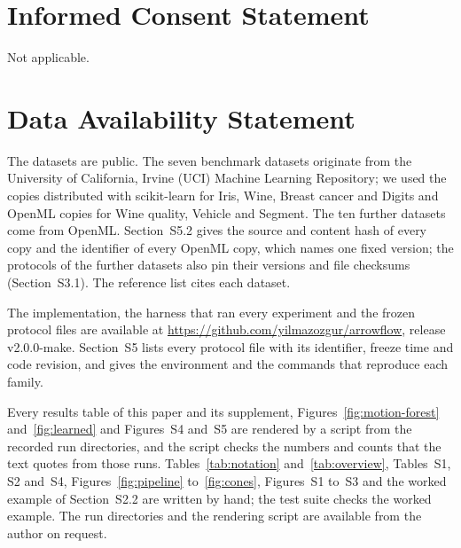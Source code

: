 \documentclass[12pt]{article}
\begin{document}
\section*{Informed Consent Statement}
Not applicable.

\section*{Data Availability Statement}

The datasets are public. The seven benchmark datasets originate from the University of California, Irvine (UCI) Machine Learning Repository; we used the copies distributed with scikit-learn for Iris, Wine, Breast cancer and Digits and OpenML copies for Wine quality, Vehicle and Segment. The ten further datasets come from OpenML. Section~S5.2 gives the source and content hash of every copy and the identifier of every OpenML copy, which names one fixed version; the protocols of the further datasets also pin their versions and file checksums (Section~S3.1). The reference list cites each dataset.

The implementation, the harness that ran every experiment and the frozen protocol files are available at \url{https://github.com/yilmazozgur/arrowflow}, release \mbox{v2.0.0-make}. Section~S5 lists every protocol file with its identifier, freeze time and code revision, and gives the environment and the commands that reproduce each family.

Every results table of this paper and its supplement, Figures~\ref{fig:motion-forest} and~\ref{fig:learned} and Figures~S4 and~S5 are rendered by a script from the recorded run directories, and the script checks the numbers and counts that the text quotes from those runs. Tables~\ref{tab:notation} and~\ref{tab:overview}, Tables~S1, S2 and~S4, Figures~\ref{fig:pipeline} to~\ref{fig:cones}, Figures~S1 to~S3 and the worked example of Section~S2.2 are written by hand; the test suite checks the worked example. The run directories and the rendering script are available from the author on request.
\end{document}
